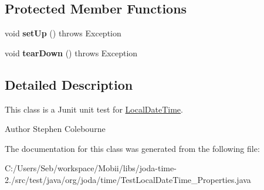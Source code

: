 \subsection*{Protected Member Functions}
\begin{DoxyCompactItemize}
\item 
\hypertarget{classorg_1_1joda_1_1time_1_1_test_local_date_time___properties_a9a55038935f41f9ccfd67b90166d7646}{void {\bfseries set\-Up} ()  throws Exception }\label{classorg_1_1joda_1_1time_1_1_test_local_date_time___properties_a9a55038935f41f9ccfd67b90166d7646}

\item 
\hypertarget{classorg_1_1joda_1_1time_1_1_test_local_date_time___properties_a6cc7b0bf03580e252d71efd96056ca5e}{void {\bfseries tear\-Down} ()  throws Exception }\label{classorg_1_1joda_1_1time_1_1_test_local_date_time___properties_a6cc7b0bf03580e252d71efd96056ca5e}

\end{DoxyCompactItemize}


\subsection{Detailed Description}
This class is a Junit unit test for \hyperlink{classorg_1_1joda_1_1time_1_1_local_date_time}{Local\-Date\-Time}.

\begin{DoxyAuthor}{Author}
Stephen Colebourne 
\end{DoxyAuthor}


The documentation for this class was generated from the following file\-:\begin{DoxyCompactItemize}
\item 
C\-:/\-Users/\-Seb/workspace/\-Mobii/libs/joda-\/time-\/2./src/test/java/org/joda/time/Test\-Local\-Date\-Time\-\_\-\-Properties.\-java\end{DoxyCompactItemize}
